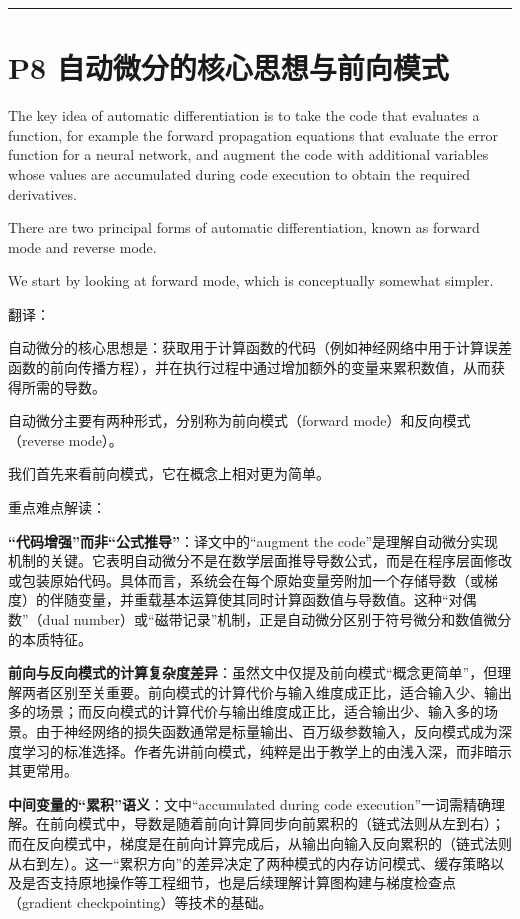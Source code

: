 \documentclass{article}
\begin{document}
\noindent\rule{\linewidth}{0.4pt}

\section{P8 自动微分的核心思想与前向模式}

The key idea of automatic differentiation is to take the code that evaluates a function, for example the forward propagation equations that evaluate the error function for a neural network, and augment the code with additional variables whose values are accumulated during code execution to obtain the required derivatives. 

There are two principal forms of automatic differentiation, known as forward mode and reverse mode. 

We start by looking at forward mode, which is conceptually somewhat simpler.

{\color{red}
翻译：

自动微分的核心思想是：获取用于计算函数的代码（例如神经网络中用于计算误差函数的前向传播方程），并在执行过程中通过增加额外的变量来累积数值，从而获得所需的导数。

自动微分主要有两种形式，分别称为前向模式（forward mode）和反向模式（reverse mode）。

我们首先来看前向模式，它在概念上相对更为简单。
}

{\color{blue}
重点难点解读：

\textbf{“代码增强”而非“公式推导”}：译文中的“augment the code”是理解自动微分实现机制的关键。它表明自动微分不是在数学层面推导导数公式，而是在程序层面修改或包装原始代码。具体而言，系统会在每个原始变量旁附加一个存储导数（或梯度）的伴随变量，并重载基本运算使其同时计算函数值与导数值。这种“对偶数”（dual number）或“磁带记录”机制，正是自动微分区别于符号微分和数值微分的本质特征。

\textbf{前向与反向模式的计算复杂度差异}：虽然文中仅提及前向模式“概念更简单”，但理解两者区别至关重要。前向模式的计算代价与输入维度成正比，适合输入少、输出多的场景；而反向模式的计算代价与输出维度成正比，适合输出少、输入多的场景。由于神经网络的损失函数通常是标量输出、百万级参数输入，反向模式成为深度学习的标准选择。作者先讲前向模式，纯粹是出于教学上的由浅入深，而非暗示其更常用。

\textbf{中间变量的“累积”语义}：文中“accumulated during code execution”一词需精确理解。在前向模式中，导数是随着前向计算同步向前累积的（链式法则从左到右）；而在反向模式中，梯度是在前向计算完成后，从输出向输入反向累积的（链式法则从右到左）。这一“累积方向”的差异决定了两种模式的内存访问模式、缓存策略以及是否支持原地操作等工程细节，也是后续理解计算图构建与梯度检查点（gradient checkpointing）等技术的基础。

}
\end{document}
